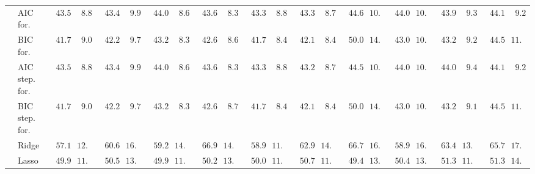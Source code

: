 \begin{tabular}{llllllllllllllllllllll}
	& AIC for.  & $\phantom{0}43.528$ & $\phantom{0}8.892$ & $\phantom{0}43.497$ & $\phantom{0}9.947$ & $\phantom{0}44.071$ & $\phantom{0}8.611$ & $\phantom{0}43.611$ & $\phantom{0}8.374$ & $\phantom{0}43.325$ & $\phantom{0}8.867$ & $\phantom{0}43.334$ & $\phantom{0}8.731$ & $\phantom{0}44.618$ & $10.525$ & $\phantom{0}44.039$ & $10.092$ & $\phantom{0}43.992$ & $\phantom{0}9.332$ & $\phantom{0}44.101$ & $\phantom{0}9.247$ \\
	& BIC for.  & $\phantom{0}41.719$ & $\phantom{0}9.087$ & $\phantom{0}42.276$ & $\phantom{0}9.754$ & $\phantom{0}43.288$ & $\phantom{0}8.336$ & $\phantom{0}42.638$ & $\phantom{0}8.640$ & $\phantom{0}41.735$ & $\phantom{0}8.409$ & $\phantom{0}42.168$ & $\phantom{0}8.481$ & $\phantom{0}50.079$ & $14.758$ & $\phantom{0}43.036$ & $10.400$ & $\phantom{0}43.298$ & $\phantom{0}9.251$ & $\phantom{0}44.588$ & $11.894$ \\
	& AIC step. for.  & $\phantom{0}43.528$ & $\phantom{0}8.892$ & $\phantom{0}43.497$ & $\phantom{0}9.947$ & $\phantom{0}44.059$ & $\phantom{0}8.603$ & $\phantom{0}43.611$ & $\phantom{0}8.374$ & $\phantom{0}43.325$ & $\phantom{0}8.867$ & $\phantom{0}43.266$ & $\phantom{0}8.760$ & $\phantom{0}44.592$ & $10.714$ & $\phantom{0}44.039$ & $10.092$ & $\phantom{0}44.088$ & $\phantom{0}9.421$ & $\phantom{0}44.127$ & $\phantom{0}9.238$ \\
	& BIC step. for.  & $\phantom{0}41.719$ & $\phantom{0}9.087$ & $\phantom{0}42.276$ & $\phantom{0}9.754$ & $\phantom{0}43.288$ & $\phantom{0}8.336$ & $\phantom{0}42.697$ & $\phantom{0}8.747$ & $\phantom{0}41.735$ & $\phantom{0}8.409$ & $\phantom{0}42.147$ & $\phantom{0}8.498$ & $\phantom{0}50.079$ & $14.761$ & $\phantom{0}43.036$ & $10.400$ & $\phantom{0}43.246$ & $\phantom{0}9.183$ & $\phantom{0}44.576$ & $11.910$ \\
	& Ridge  & $\phantom{0}57.109$ & $12.364$ & $\phantom{0}60.687$ & $16.583$ & $\phantom{0}59.289$ & $14.307$ & $\phantom{0}66.974$ & $14.284$ & $\phantom{0}58.930$ & $11.533$ & $\phantom{0}62.949$ & $14.330$ & $\phantom{0}66.771$ & $16.957$ & $\phantom{0}58.947$ & $16.108$ & $\phantom{0}63.405$ & $13.819$ & $\phantom{0}65.715$ & $17.329$ \\
	& Lasso  & $\phantom{0}49.962$ & $11.595$ & $\phantom{0}50.593$ & $13.047$ & $\phantom{0}49.936$ & $11.403$ & $\phantom{0}50.230$ & $13.138$ & $\phantom{0}50.002$ & $11.410$ & $\phantom{0}50.772$ & $11.476$ & $\phantom{0}49.464$ & $13.999$ & $\phantom{0}50.472$ & $13.673$ & $\phantom{0}51.335$ & $11.675$ & $\phantom{0}51.397$ & $14.976$ \\

\end{tabular}
